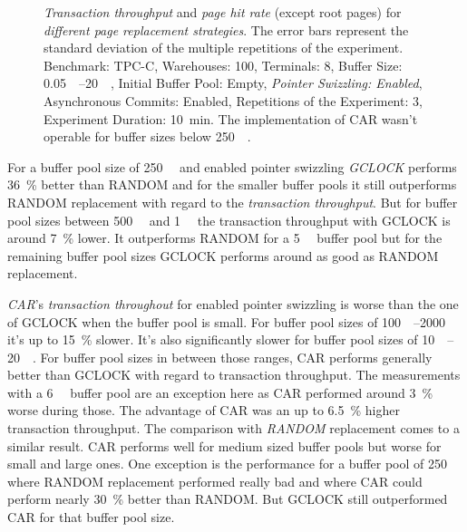 \begin{@empty}
\begin{figure}[ht!]
{
		}
		\caption{\emph{Transaction throughput} and \emph{page hit rate} (except root pages) for \emph{different page replacement strategies}. The error bars represent the standard deviation of the multiple repetitions of the experiment. Benchmark: TPC-C, Warehouses: 100, Terminals: 8, Buffer Size: \SIrange{0.05}{20}{\gibi\byte}, Initial Buffer Pool: Empty, \emph{Pointer Swizzling: Enabled}, Asynchronous Commits: Enabled, Repetitions of the Experiment: 3, Experiment Duration: \SI{10}{\minute}. The implementation of CAR wasn't operable for buffer sizes below \SI{250}{\mebi\byte}.}
		\label{fig:swizzlingpagereplacement}
	\end{figure}
\end{@empty}

	For a buffer pool size of \SI{250}{\mebi\byte} and enabled pointer swizzling \emph{GCLOCK} performs \SI{36}{\percent} better than RANDOM and for the smaller buffer pools it still outperforms RANDOM replacement with regard to the \emph{transaction throughput}. But for buffer pool sizes between \SI{500}{\mebi\byte} and \SI{1}{\gibi\byte} the transaction throughput with GCLOCK is around \SI{7}{\percent} lower. It outperforms RANDOM for a \SI{5}{\gibi\byte} buffer pool but for the remaining buffer pool sizes GCLOCK performs around as good as RANDOM replacement.
	
	\emph{CAR}'s \emph{transaction throughout} for enabled pointer swizzling is worse than the one of GCLOCK when the buffer pool is small. For buffer pool sizes of \SIrange{100}{2000}{\mebi\byte} it's up to \SI{15}{\percent} slower. It's also significantly slower for buffer pool sizes of \SIrange{10}{20}{\gibi\byte}. For buffer pool sizes in between those ranges, CAR performs generally better than GCLOCK with regard to transaction throughput. The measurements with a \SI{6}{\gibi\byte} buffer pool are an exception here as CAR performed around \SI{3}{\percent} worse during those. The advantage of CAR was an up to \SI{6.5}{\percent} higher transaction throughput. The comparison with \emph{RANDOM} replacement comes to a similar result. CAR performs well for medium sized buffer pools but worse for small and large ones. One exception is the performance for a buffer pool of \SI{250}{\mebi\byte} where RANDOM replacement performed really bad and where CAR could perform nearly \SI{30}{\percent} better than RANDOM. But GCLOCK still outperformed CAR for that buffer pool size.
	

